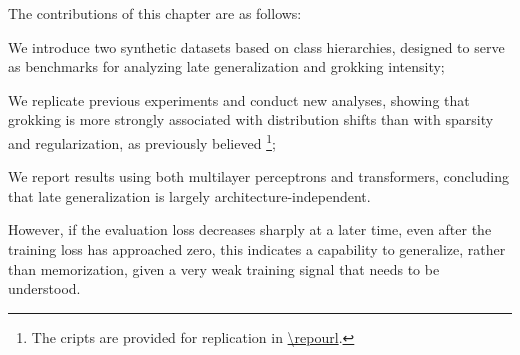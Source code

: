﻿\documentclass[../ppgc-tese.tex]{subfiles}
\begin{document}
The contributions of this chapter are as follows:
\begin{enumerate*}[label=(\roman*)]
    \item We introduce two synthetic datasets based on class hierarchies, designed to serve as benchmarks for analyzing late generalization and grokking intensity; 
    \item We replicate previous experiments and conduct new analyses, showing that grokking is more strongly associated with distribution shifts than with sparsity and regularization, as previously believed \footnote{The cripts are provided for replication in \url{\repourl}.};
    \item We report results using both multilayer perceptrons and transformers, concluding that late generalization is largely architecture-independent. 
\end{enumerate*}


However, if the evaluation loss decreases sharply at a later time, even after the training loss has approached zero, this indicates a capability to generalize, rather than memorization, given a very weak training signal that needs to be understood. 
\end{document}

